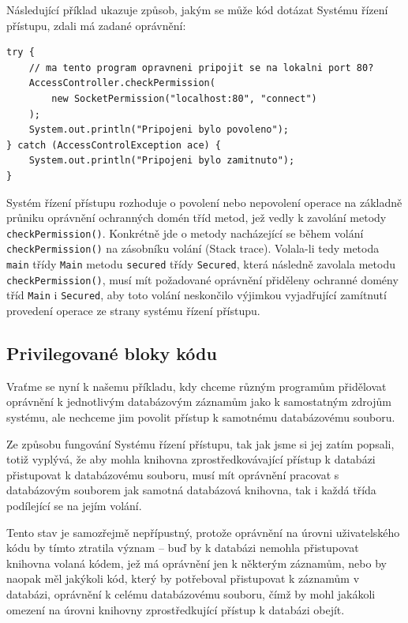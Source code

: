Následující příklad ukazuje způsob, jakým se může kód dotázat Systému řízení přístupu, zdali má zadané oprávnění: \cite[5.5]{oaks}

\begin{lstlisting}[caption=Příklad použití Systému řízení přístupu, label=pouzitiAC]
try {
    // ma tento program opravneni pripojit se na lokalni port 80?
    AccessController.checkPermission(
        new SocketPermission("localhost:80", "connect")
    );
    System.out.println("Pripojeni bylo povoleno");
} catch (AccessControlException ace) {
    System.out.println("Pripojeni bylo zamitnuto");
}
\end{lstlisting}

Systém řízení přístupu rozhoduje o povolení nebo nepovolení operace na základně průniku oprávnění ochranných domén tříd metod, jež vedly k zavolání metody {\tt checkPermission()}. Konkrétně jde o metody nacházející se během volání {\tt checkPermission()} na zásobníku volání (Stack trace). Volala-li tedy metoda {\tt main} třídy {\tt Main} metodu {\tt secured} třídy {\tt Secured}, která následně zavolala metodu {\tt checkPermission()}, musí mít požadované oprávnění přiděleny ochranné domény tříd {\tt Main} i {\tt Secured}, aby toto volání neskončilo výjimkou vyjadřující zamítnutí provedení operace ze strany systému řízení přístupu. \cite[5.5]{oaks}\cite[6.1]{oaks}

\subsection{Privilegované bloky kódu}\label{privilegovaneBloky}

Vraťme se nyní k našemu příkladu, kdy chceme různým programům přidělovat oprávnění k jednotlivým databázovým záznamům jako k samostatným zdrojům systému, ale nechceme jim povolit přístup k samotnému databázovému souboru.

Ze způsobu fungování Systému řízení přístupu, tak jak jsme si jej zatím popsali, totiž vyplývá, že aby mohla knihovna zprostředkovávající přístup k databázi přistupovat k databázovému souboru, musí mít oprávnění pracovat s databázovým souborem jak samotná databázová knihovna, tak i každá třída podílející se na jejím volání.

Tento stav je samozřejmě nepřípustný, protože oprávnění na úrovni uživatelského kódu by tímto ztratila význam -- buď by k databázi nemohla přistupovat knihovna volaná kódem, jež má oprávnění jen k některým záznamům, nebo by naopak měl jakýkoli kód, který by potřeboval přistupovat k záznamům v databázi, oprávnění k celému databázovému souboru, čímž by mohl jakákoli omezení na úrovni knihovny zprostředkující přístup k databázi obejít.

